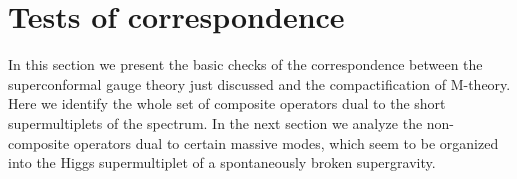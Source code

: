 \documentclass[a4paper,12pt]{article}
\def\n010{N^{0,1,0}}
\begin{document}
\section{Tests of correspondence}\label{comparison}
In this section we present the basic checks of the correspondence
between the \coordHE{} superconformal gauge theory just
discussed and the \myHighlight{$\n010$}\coordHE{} compactification of M-theory.
Here we identify the whole set of \coordHE{} composite operators
dual to the short supermultiplets of the \coordHE{} spectrum.
In the next section we analyze the non-\coordHE{} composite operators
dual to certain massive \coordHE{} modes, which seem to be organized
into the Higgs supermultiplet of a spontaneously broken \coordHE{}
supergravity.
\end{document}
